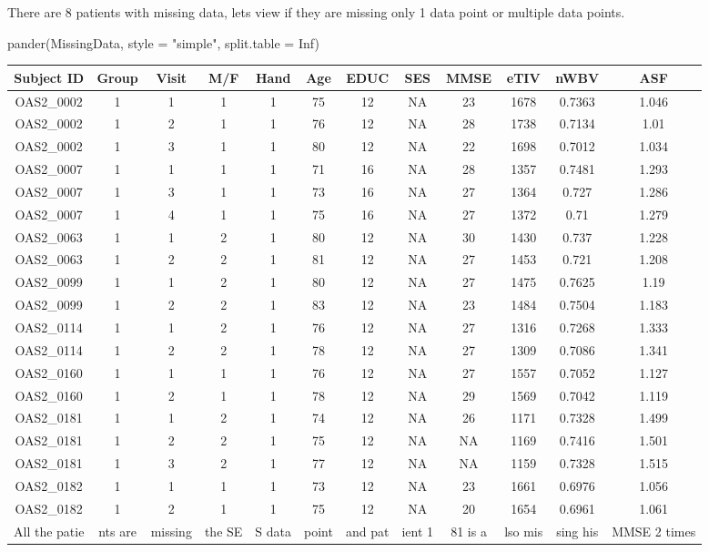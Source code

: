 \documentclass[
]{article}
\newenvironment{Shaded}{\begin{snugshade}}{\end{snugshade}}
\newcommand{\AttributeTok}[1]{\textcolor[rgb]{0.77,0.63,0.00}{#1}}
\newcommand{\ConstantTok}[1]{\textcolor[rgb]{0.00,0.00,0.00}{#1}}
\newcommand{\FunctionTok}[1]{\textcolor[rgb]{0.00,0.00,0.00}{#1}}
\newcommand{\NormalTok}[1]{#1}
\newcommand{\StringTok}[1]{\textcolor[rgb]{0.31,0.60,0.02}{#1}}
\begin{document}
There are 8 patients with missing data, lets view if they are missing
only 1 data point or multiple data points.

\begin{Shaded}
\begin{Highlighting}[]
\FunctionTok{pander}\NormalTok{(MissingData, }\AttributeTok{style =} \StringTok{"simple"}\NormalTok{, }\AttributeTok{split.table =} \ConstantTok{Inf}\NormalTok{)}
\end{Highlighting}
\end{Shaded}

\begin{longtable}[]{@{}cccccccccccc@{}}
\toprule()
Subject ID & Group & Visit & M/F & Hand & Age & EDUC & SES & MMSE & eTIV
& nWBV & ASF \\
\midrule()
\endhead
OAS2\_0002 & 1 & 1 & 1 & 1 & 75 & 12 & NA & 23 & 1678 & 0.7363 &
1.046 \\
OAS2\_0002 & 1 & 2 & 1 & 1 & 76 & 12 & NA & 28 & 1738 & 0.7134 & 1.01 \\
OAS2\_0002 & 1 & 3 & 1 & 1 & 80 & 12 & NA & 22 & 1698 & 0.7012 &
1.034 \\
OAS2\_0007 & 1 & 1 & 1 & 1 & 71 & 16 & NA & 28 & 1357 & 0.7481 &
1.293 \\
OAS2\_0007 & 1 & 3 & 1 & 1 & 73 & 16 & NA & 27 & 1364 & 0.727 & 1.286 \\
OAS2\_0007 & 1 & 4 & 1 & 1 & 75 & 16 & NA & 27 & 1372 & 0.71 & 1.279 \\
OAS2\_0063 & 1 & 1 & 2 & 1 & 80 & 12 & NA & 30 & 1430 & 0.737 & 1.228 \\
OAS2\_0063 & 1 & 2 & 2 & 1 & 81 & 12 & NA & 27 & 1453 & 0.721 & 1.208 \\
OAS2\_0099 & 1 & 1 & 2 & 1 & 80 & 12 & NA & 27 & 1475 & 0.7625 & 1.19 \\
OAS2\_0099 & 1 & 2 & 2 & 1 & 83 & 12 & NA & 23 & 1484 & 0.7504 &
1.183 \\
OAS2\_0114 & 1 & 1 & 2 & 1 & 76 & 12 & NA & 27 & 1316 & 0.7268 &
1.333 \\
OAS2\_0114 & 1 & 2 & 2 & 1 & 78 & 12 & NA & 27 & 1309 & 0.7086 &
1.341 \\
OAS2\_0160 & 1 & 1 & 1 & 1 & 76 & 12 & NA & 27 & 1557 & 0.7052 &
1.127 \\
OAS2\_0160 & 1 & 2 & 1 & 1 & 78 & 12 & NA & 29 & 1569 & 0.7042 &
1.119 \\
OAS2\_0181 & 1 & 1 & 2 & 1 & 74 & 12 & NA & 26 & 1171 & 0.7328 &
1.499 \\
OAS2\_0181 & 1 & 2 & 2 & 1 & 75 & 12 & NA & NA & 1169 & 0.7416 &
1.501 \\
OAS2\_0181 & 1 & 3 & 2 & 1 & 77 & 12 & NA & NA & 1159 & 0.7328 &
1.515 \\
OAS2\_0182 & 1 & 1 & 1 & 1 & 73 & 12 & NA & 23 & 1661 & 0.6976 &
1.056 \\
OAS2\_0182 & 1 & 2 & 1 & 1 & 75 & 12 & NA & 20 & 1654 & 0.6961 &
1.061 \\
All the patie & nts are & missing & the SE & S data & point & and pat &
ient 1 & 81 is a & lso mis & sing his & MMSE 2 times \\
\bottomrule()
\end{longtable}
\end{document}
